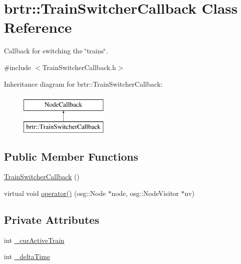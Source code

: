 \hypertarget{classbrtr_1_1_train_switcher_callback}{\section{brtr\+:\+:Train\+Switcher\+Callback Class Reference}
\label{classbrtr_1_1_train_switcher_callback}
}


Callback for switching the \char`\"{}trains\char`\"{}.  




{\ttfamily \#include $<$Train\+Switcher\+Callback.\+h$>$}

Inheritance diagram for brtr\+:\+:Train\+Switcher\+Callback\+:\begin{figure}[H]
\begin{center}
\leavevmode
\includegraphics[height=2.000000cm]{classbrtr_1_1_train_switcher_callback}
\end{center}
\end{figure}
\subsection*{Public Member Functions}
\begin{DoxyCompactItemize}
\item 
\hyperlink{classbrtr_1_1_train_switcher_callback_a54ad53b07976bf34af2a0e6061088f3c}{Train\+Switcher\+Callback} ()
\item 
virtual void \hyperlink{classbrtr_1_1_train_switcher_callback_a5a8182c650febc07a8443f6a35c32087}{operator()} (osg\+::\+Node $\ast$node, osg\+::\+Node\+Visitor $\ast$nv)
\end{DoxyCompactItemize}
\subsection*{Private Attributes}
\begin{DoxyCompactItemize}
\item 
int \hyperlink{classbrtr_1_1_train_switcher_callback_ac87e64555ad379814a93220447c49257}{\+\_\+cur\+Active\+Train}
\item 
int \hyperlink{classbrtr_1_1_train_switcher_callback_a1d2fbe75d19ca03cba449cdf4277f0eb}{\+\_\+delta\+Time}
\end{DoxyCompactItemize}


